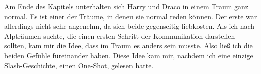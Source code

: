 \begin{kommentar}
Am Ende des Kapitels unterhalten sich Harry und Draco in einem Traum ganz normal. Es ist einer der Träume, in denen sie normal reden können. Der erste war allerdings nicht sehr angenehm, da sich beide gegenseitig liebkosten. Als ich nach Alpträumen suchte, die einen ersten Schritt der Kommunikation darstellen sollten, kam mir die Idee, dass im Traum es anders sein musste. Also ließ ich die beiden Gefühle füreinander haben. Diese Idee kam mir, nachdem ich eine einzige Slash-Geschichte, einen One-Shot, gelesen hatte.
\end{kommentar}
